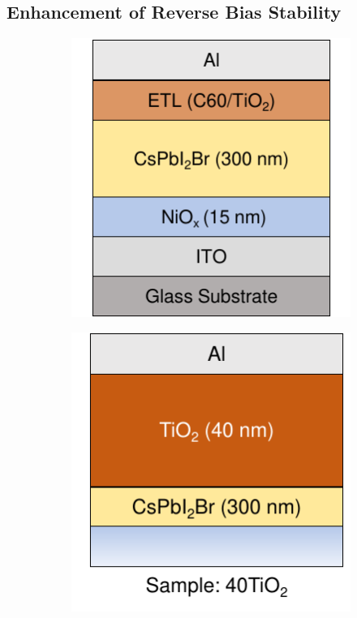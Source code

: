 \subsection{Enhancement of Reverse Bias Stability}

\begin{figure}[htbp]
    \centering
    \begin{subfigure}{0.24\textwidth}
        \centering
        \includegraphics[width=\textwidth]{chapters/transport_layers/images/ETL_optimization_stack.pdf}
        \caption{}
        \label{}
    \end{subfigure}
    \hfill
    \begin{subfigure}{0.24\textwidth}
        \centering
        \includegraphics[width=\textwidth]{chapters/transport_layers/images/ETL_Optimization_40TiO2.pdf}

\end{subfigure}
\end{figure}
